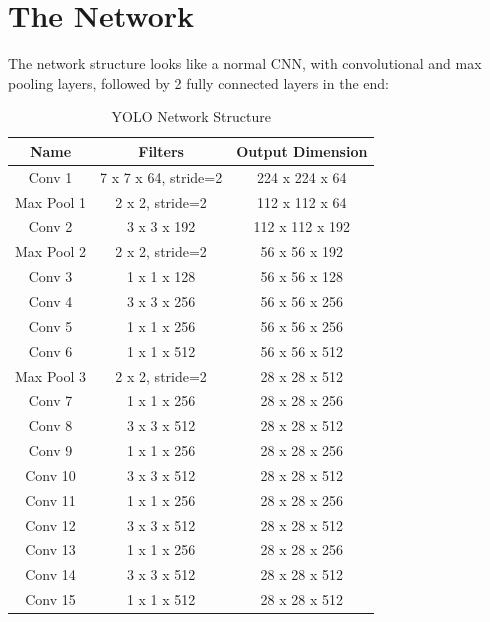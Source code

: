\section{The Network}
The network structure looks like a normal CNN, with convolutional and max pooling layers, followed by 2 fully connected layers in the end:


\begin{table}[!h]
  \centering
  \caption[YOLO Network Structure]{YOLO Network Structure}
  \label{tab:yolo-network}
  {\renewcommand{\arraystretch}{1.3}
    \begin{tabular}{c c c}
      \toprule
      Name       &        Filters         & Output Dimension  \\
      \hline
      Conv 1     & 7 x 7 x 64, stride=2   & 224 x 224 x 64    \\
      Max Pool 1 & 2 x 2, stride=2        & 112 x 112 x 64    \\
      Conv 2     & 3 x 3 x 192            & 112 x 112 x 192   \\
      Max Pool 2 & 2 x 2, stride=2        & 56 x 56 x 192     \\
      Conv 3     & 1 x 1 x 128            & 56 x 56 x 128     \\
      Conv 4     & 3 x 3 x 256            & 56 x 56 x 256     \\
      Conv 5     & 1 x 1 x 256            & 56 x 56 x 256     \\
      Conv 6     & 1 x 1 x 512            & 56 x 56 x 512     \\
      Max Pool 3 & 2 x 2, stride=2        & 28 x 28 x 512     \\
      Conv 7     & 1 x 1 x 256            & 28 x 28 x 256     \\
      Conv 8     & 3 x 3 x 512            & 28 x 28 x 512     \\
      Conv 9     & 1 x 1 x 256            & 28 x 28 x 256     \\
      Conv 10    & 3 x 3 x 512            & 28 x 28 x 512     \\
      Conv 11    & 1 x 1 x 256            & 28 x 28 x 256     \\
      Conv 12    & 3 x 3 x 512            & 28 x 28 x 512     \\
      Conv 13    & 1 x 1 x 256            & 28 x 28 x 256     \\
      Conv 14    & 3 x 3 x 512            & 28 x 28 x 512     \\
      Conv 15    & 1 x 1 x 512            & 28 x 28 x 512     \\

\end{tabular}}
\end{table}
